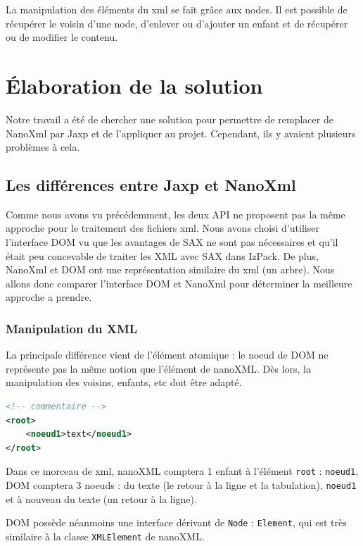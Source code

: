 La manipulation des éléments du xml se fait grâce aux nodes.
Il est possible de récupérer le voisin d'une node, d'enlever ou d'ajouter un enfant et de récupérer ou de modifier le contenu.
\section{Élaboration de la solution}
Notre travail a été de chercher une solution pour permettre de remplacer de NanoXml par Jaxp et de l'appliquer au projet.
Cependant, ils y avaient plusieurs problèmes à cela.
\subsection{Les différences entre Jaxp et NanoXml}
Comme nous avons vu précédemment, les deux API ne proposent pas la même approche pour le traitement des fichiers xml.
Nous avons choisi d'utiliser l'interface DOM vu que les avantages de SAX ne sont pas nécessaires et qu'il était peu concevable de traiter les XML avec SAX dans IzPack.
De plus, NanoXml et DOM ont une représentation similaire du xml (un arbre).
Nous allons donc comparer l'interface DOM et NanoXml pour déterminer la meilleure approche a prendre.
\subsubsection{Manipulation du XML}
La principale différence vient de l'élément atomique : le noeud de DOM ne représente pas la même notion que l'élément de nanoXML.
Dès lors, la manipulation des voisins, enfants, etc doit être adapté.
\begin{lstlisting}[language=xml]
<!-- commentaire -->
<root>
	<noeud1>text</noeud1>
</root>
\end{lstlisting}
Dans ce morceau de xml, nanoXML comptera 1 enfant à l'élément \verb|root| : \verb|noeud1|.
DOM comptera 3 noeuds : du texte (le retour à la ligne et la tabulation), \verb|noeud1| et à nouveau du texte (un retour à la ligne).

DOM possède néanmoins une interface dérivant de \verb|Node| : \verb|Element|, qui est très similaire à la classe \verb|XMLElement| de nanoXML.
